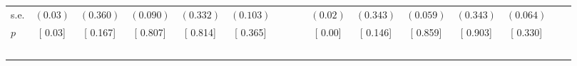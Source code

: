 \begin{longtable}{L{8em} c c c c c c c p{1em} c c c c c c c}
\quad \quad \quad \quad s.e.& $ (     0.03)$ & $ (    0.360)$ & $ (    0.090)$ & $ (    0.332)$ & $ (    0.103)$ & & & & $ (     0.02)$ & $ (    0.343)$ & $ (    0.059)$ & $ (    0.343)$ & $ (    0.064)$ & &  \\*
\quad \quad \quad \quad $ p$ & [     0.03] & [    0.167] & [    0.807] & [    0.814] & [    0.365] & & & & [     0.00] & [    0.146] & [    0.859] & [    0.903] & [    0.330] & &  \\[1em]
~\\[1em]
\end{longtable}